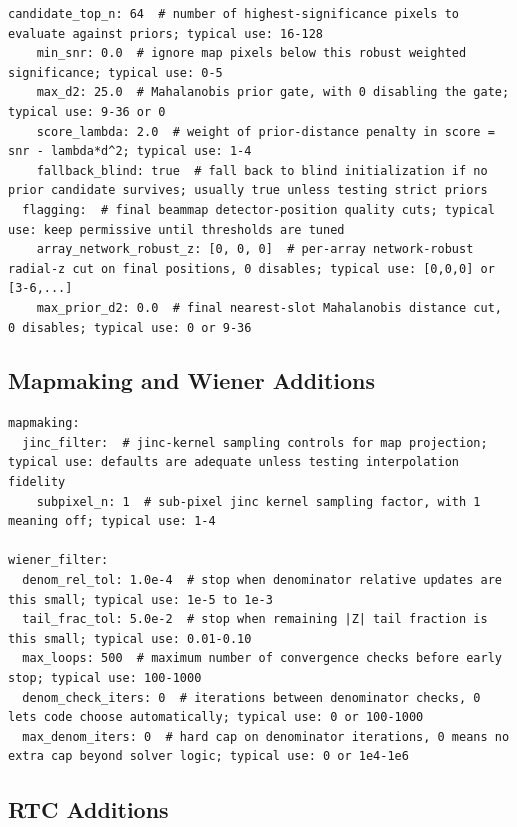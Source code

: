 \documentclass[11pt]{article}
\begin{document}
\begin{lstlisting}[language={}]
    candidate_top_n: 64  # number of highest-significance pixels to evaluate against priors; typical use: 16-128
    min_snr: 0.0  # ignore map pixels below this robust weighted significance; typical use: 0-5
    max_d2: 25.0  # Mahalanobis prior gate, with 0 disabling the gate; typical use: 9-36 or 0
    score_lambda: 2.0  # weight of prior-distance penalty in score = snr - lambda*d^2; typical use: 1-4
    fallback_blind: true  # fall back to blind initialization if no prior candidate survives; usually true unless testing strict priors
  flagging:  # final beammap detector-position quality cuts; typical use: keep permissive until thresholds are tuned
    array_network_robust_z: [0, 0, 0]  # per-array network-robust radial-z cut on final positions, 0 disables; typical use: [0,0,0] or [3-6,...]
    max_prior_d2: 0.0  # final nearest-slot Mahalanobis distance cut, 0 disables; typical use: 0 or 9-36
\end{lstlisting}

\subsection{Mapmaking and Wiener Additions}

\begin{lstlisting}[language={}]
mapmaking:
  jinc_filter:  # jinc-kernel sampling controls for map projection; typical use: defaults are adequate unless testing interpolation fidelity
    subpixel_n: 1  # sub-pixel jinc kernel sampling factor, with 1 meaning off; typical use: 1-4

wiener_filter:
  denom_rel_tol: 1.0e-4  # stop when denominator relative updates are this small; typical use: 1e-5 to 1e-3
  tail_frac_tol: 5.0e-2  # stop when remaining |Z| tail fraction is this small; typical use: 0.01-0.10
  max_loops: 500  # maximum number of convergence checks before early stop; typical use: 100-1000
  denom_check_iters: 0  # iterations between denominator checks, 0 lets code choose automatically; typical use: 0 or 100-1000
  max_denom_iters: 0  # hard cap on denominator iterations, 0 means no extra cap beyond solver logic; typical use: 0 or 1e4-1e6
\end{lstlisting}

\subsection{RTC Additions}
\end{document}
